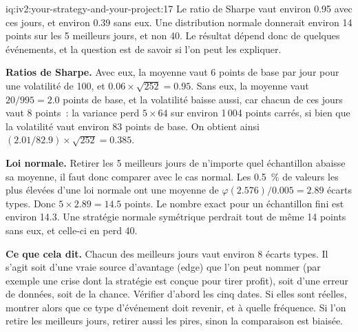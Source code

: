 \begin{solution}{iq:iv2:your-strategy-and-your-project:17}
Le ratio de Sharpe vaut environ 0.95 avec ces jours, et environ 0.39 sans eux. Une distribution normale donnerait environ 14 points sur les 5 meilleurs jours, et non 40. Le résultat dépend donc de quelques événements, et la question est de savoir si l'on peut les expliquer.

\textbf{Ratios de Sharpe.} Avec eux, la moyenne vaut 6 points de base par jour pour une volatilité de 100, et $0.06 \times \sqrt{252} = 0.95$. Sans eux, la moyenne vaut $20/995 = 2.0$ points de base, et la volatilité baisse aussi, car chacun de ces jours vaut 8 points~: la variance perd $5 \times 64$ sur environ 1\,004 points carrés, si bien que la volatilité vaut environ 83 points de base. On obtient ainsi $(2.01/82.9) \times \sqrt{252} = 0.385$.

\textbf{Loi normale.} Retirer les 5 meilleurs jours de n'importe quel échantillon abaisse sa moyenne, il faut donc comparer avec le cas normal. Les 0.5~\% de valeurs les plus élevées d'une loi normale ont une moyenne de $\varphi(2.576)/0.005 = 2.89$ écarts types. Donc $5 \times 2.89 = 14.5$ points. Le nombre exact pour un échantillon fini est environ 14.3. Une stratégie normale symétrique perdrait tout de même 14 points sans eux, et celle-ci en perd 40.

\textbf{Ce que cela dit.} Chacun des meilleurs jours vaut environ 8 écarts types. Il s'agit soit d'une vraie source d'avantage (edge) que l'on peut nommer (par exemple une crise dont la stratégie est conçue pour tirer profit), soit d'une erreur de données, soit de la chance. Vérifier d'abord les cinq dates. Si elles sont réelles, montrer alors que ce type d'événement doit revenir, et à quelle fréquence. Si l'on retire les meilleurs jours, retirer aussi les pires, sinon la comparaison est biaisée.

\end{solution}

